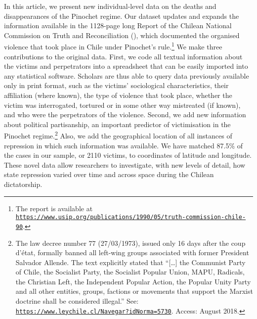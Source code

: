 \documentclass[a4paper,12pt]{article}
\begin{document}
In this article, we present new individual-level data on the deaths and disappearances of the Pinochet regime. Our dataset updates and expands the information available in the 1128-page long Report of the Chilean National Commission on Truth and Reconciliation (\citeyear{report1991}), which documented the organised violence that took place in Chile under Pinochet's rule.\footnote{The report is available at \href{https://www.usip.org/publications/1990/05/truth-commission-chile-90}{\texttt{https://www.usip.org/publications/1990/05/truth-commission-chile-90}}.} We make three contributions to the original data. First, we code all textual information about the victims and perpetrators into a spreadsheet that can be easily imported into any statistical software. Scholars are thus able to query data previously available only in print format, such as the victims' sociological characteristics, their affiliation (where known), the type of violence that took place, whether the victim was interrogated, tortured or in some other way mistreated (if known), and who were the perpetrators of the violence. Second, we add new information about political partisanship, an important predictor of victimisation in the Pinochet regime.\footnote{The law decree number 77 (27/03/1973), issued only 16 days after the coup d'état, formally banned all left-wing groups associated with former President Salvador Allende. The text explicitly stated that ``[\dots] the Communist Party of Chile, the Socialist Party, the Socialist Popular Union, MAPU, Radicals, the Christian Left, the Independent Popular Action, the Popular Unity Party and all other entities, groups, factions or movements that support the Marxist doctrine shall be considered illegal.'' See: \href{https://www.leychile.cl/Navegar?idNorma=5730}{\texttt{https://www.leychile.cl/Navegar?idNorma=5730}}. Access: August 2018.} Also, we add the geographical location of all instances of repression in which such information was available. We have matched 87.5\% of the cases in our sample, or 2110 victims, to coordinates of latitude and longitude. These novel data allow researchers to investigate, with new levels of detail, how state repression varied over time and across space during the Chilean dictatorship.
	
\end{document}

